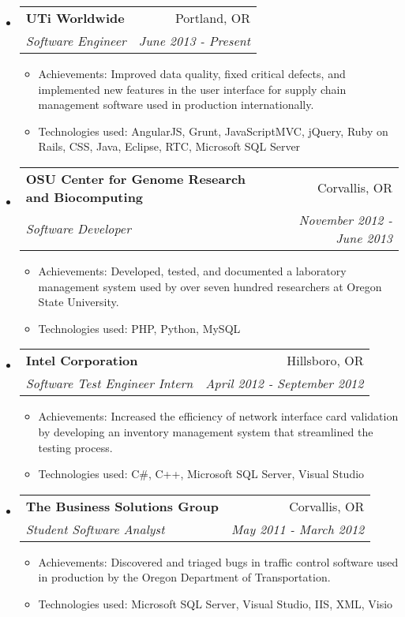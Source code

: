 \documentclass[letterpaper,11pt]{article}
\makeatletter
\newcommand{\resitem}[1]{\item #1 \vspace{-2pt}}
\newcommand{\ressubheading}[4]{

\begin{tabular*}{6.5in}{l@{\cftdotfill{\cftsecdotsep}\extracolsep{\fill}}r}

\textbf{#1} & #2 \\

\textit{#3} & \textit{#4} \\

\end{tabular*}\vspace{-6pt}}
\makeatother
\begin{document}
\begin{itemize}

	\item

		\ressubheading{UTi Worldwide}{Portland, OR}{Software Engineer}{June 2013 - Present}

		\begin{itemize}

		\resitem{Achievements: Improved data quality, fixed critical defects, and implemented new features in the user interface for supply chain management software used in production internationally.}
		\resitem{Technologies used: AngularJS, Grunt, JavaScriptMVC, jQuery, Ruby on Rails, CSS, Java, Eclipse, RTC, Microsoft SQL Server}

		\end{itemize}

	\item
        
	\ressubheading{OSU Center for Genome Research and Biocomputing}{Corvallis, OR}{Software Developer}{November 2012 - June 2013}

        \begin{itemize}

    	\resitem{Achievements: Developed, tested, and documented a laboratory management system used by over seven hundred researchers at Oregon State University.}
		\resitem{Technologies used: PHP, Python, MySQL}

		\end{itemize}

	\item
        
	\ressubheading{Intel Corporation}{Hillsboro, OR}{Software Test Engineer Intern}{April 2012 - September 2012}

        \begin{itemize}

    	\resitem{Achievements: Increased the efficiency of network interface card validation by developing an inventory management system that streamlined the testing process.}
		\resitem{Technologies used: C\#, C++, Microsoft SQL Server, Visual Studio}

		\end{itemize}

	\item
	
	\ressubheading{The Business Solutions Group}{Corvallis, OR}{Student Software Analyst}{May 2011 -  March 2012}

       	\begin{itemize}

		\resitem{Achievements: Discovered and triaged bugs in traffic control software used in production by the Oregon Department of Transportation.}
		\resitem{Technologies used: Microsoft SQL Server, Visual Studio, IIS, XML, Visio }

		\end{itemize}
	
\end{itemize}
\end{document}
